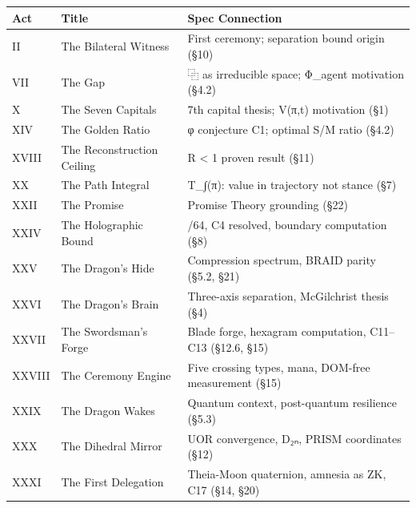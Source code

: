\documentclass[
]{article}
\newcounter{none} %
\begin{document}
{\def\LTcaptype{none} %
\begin{longtable}[]{@{}
  >{\raggedright\arraybackslash}p{}
  >{\raggedright\arraybackslash}p{}
  >{\raggedright\arraybackslash}p{}@{}}
\toprule\noalign{}
\begin{minipage}[b]{\linewidth}\raggedright
Act
\end{minipage} & \begin{minipage}[b]{\linewidth}\raggedright
Title
\end{minipage} & \begin{minipage}[b]{\linewidth}\raggedright
Spec Connection
\end{minipage} \\
\midrule\noalign{}
\endhead
\bottomrule\noalign{}
\endlastfoot
II & The Bilateral Witness & First ceremony; separation bound origin
(§10) \\
VII & The Gap & ⿻ as irreducible space; Φ\_agent motivation (§4.2) \\
X & The Seven Capitals & 7th capital thesis; V(π,t) motivation (§1) \\
XIV & The Golden Ratio & φ conjecture C1; optimal S/M ratio (§4.2) \\
XVIII & The Reconstruction Ceiling & R \textless{} 1 proven result
(§11) \\
XX & The Path Integral & T\_∫(π): value in trajectory not stance (§7) \\
XXII & The Promise & Promise Theory grounding (§22) \\
XXIV & The Holographic Bound & 96/64, C4 resolved, boundary computation
(§8) \\
XXV & The Dragon's Hide & Compression spectrum, BRAID parity (§5.2,
§21) \\
XXVI & The Dragon's Brain & Three-axis separation, McGilchrist thesis
(§4) \\
XXVII & The Swordsman's Forge & Blade forge, hexagram computation,
C11--C13 (§12.6, §15) \\
XXVIII & The Ceremony Engine & Five crossing types, mana, DOM-free
measurement (§15) \\
XXIX & The Dragon Wakes & Quantum context, post-quantum resilience
(§5.3) \\
XXX & The Dihedral Mirror & UOR convergence, D₂ₙ, PRISM coordinates
(§12) \\
XXXI & The First Delegation & Theia-Moon quaternion, amnesia as ZK, C17
(§14, §20) \\
\end{longtable}
}
\end{document}
